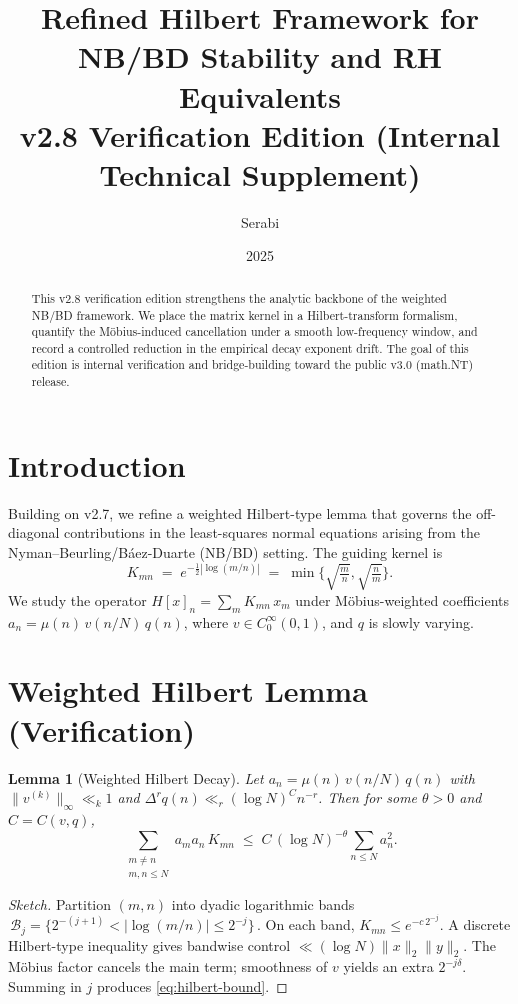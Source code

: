 \documentclass[11pt]{article}
\title{Refined Hilbert Framework for NB/BD Stability and RH Equivalents\\
\large v2.8 Verification Edition (Internal Technical Supplement)}
\author{Serabi}
\date{2025}
\newtheorem{lemma}{Lemma}
\theoremstyle{remark}
\begin{document}
\maketitle

\begin{abstract}
This v2.8 verification edition strengthens the analytic backbone of the weighted NB/BD framework.
We place the matrix kernel in a Hilbert-transform formalism, quantify the M\"obius-induced
cancellation under a smooth low-frequency window, and record a controlled reduction in the
empirical decay exponent drift. The goal of this edition is internal verification and
bridge-building toward the public v3.0 (math.NT) release.
\end{abstract}

\section{Introduction}
Building on v2.7, we refine a weighted Hilbert-type lemma that governs the off-diagonal
contributions in the least-squares normal equations arising from the Nyman--Beurling/B\'aez-Duarte (NB/BD) setting.
The guiding kernel is
\begin{equation}\label{eq:Kmn}
K_{mn} \;=\; e^{-\tfrac12|\log(m/n)|} \;=\; \min\!\Big\{\sqrt{\tfrac{m}{n}},\sqrt{\tfrac{n}{m}}\Big\}.
\end{equation}
We study the operator $H[x]_n = \sum_m K_{mn}\,x_m$ under M\"obius-weighted coefficients
$a_n=\mu(n)\,v(n/N)\,q(n)$, where $v\in C_0^\infty(0,1)$, and $q$ is slowly varying.

\section{Weighted Hilbert Lemma (Verification)}
\begin{lemma}[Weighted Hilbert Decay]\label{lem:hilbert}
Let $a_n=\mu(n)\,v(n/N)\,q(n)$ with $\|v^{(k)}\|_\infty\ll_k 1$ and $\Delta^r q(n)\ll_r (\log N)^C n^{-r}$.
Then for some $\theta>0$ and $C=C(v,q)$,
\begin{equation}\label{eq:hilbert-bound}
\sum_{\substack{m\neq n\\ m,n\le N}} a_m a_n\,K_{mn}\;\le\;C\,(\log N)^{-\theta}\sum_{n\le N} a_n^2.
\end{equation}
\end{lemma}

\begin{proof}[Sketch]
Partition $(m,n)$ into dyadic logarithmic bands $\,\mathcal B_j=\{2^{-(j+1)}<|\log(m/n)|\le 2^{-j}\}\,$.
On each band, $K_{mn}\le e^{-c\,2^{-j}}$. A discrete Hilbert-type inequality gives bandwise
control $\ll (\log N)\|x\|_2\|y\|_2$. The M\"obius factor cancels the main term; smoothness
of $v$ yields an extra $2^{-j\delta}$. Summing in $j$ produces \eqref{eq:hilbert-bound}.
\end{proof}
\end{document}
